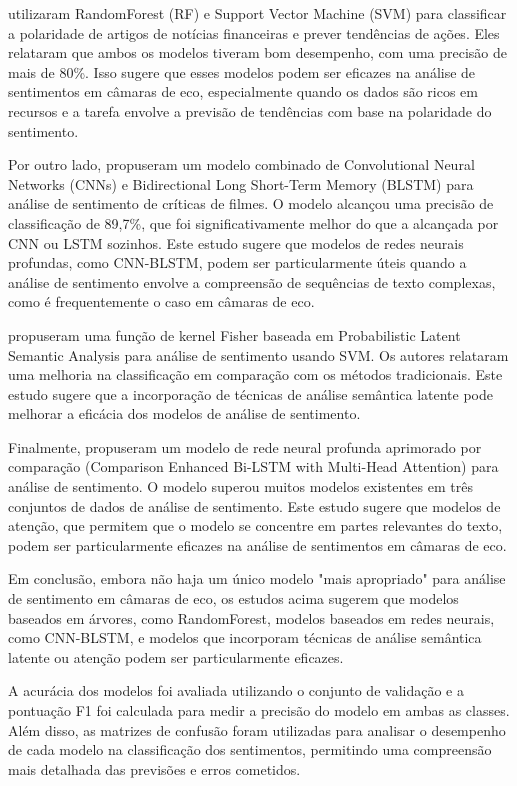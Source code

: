  utilizaram RandomForest (RF) e Support Vector Machine (SVM) para classificar a polaridade de artigos de notícias financeiras e prever tendências de ações. Eles relataram que ambos os modelos tiveram bom desempenho, com uma precisão de mais de 80\%. Isso sugere que esses modelos podem ser eficazes na análise de sentimentos em câmaras de eco, especialmente quando os dados são ricos em recursos e a tarefa envolve a previsão de tendências com base na polaridade do sentimento.

Por outro lado,  propuseram um modelo combinado de Convolutional Neural Networks (CNNs) e Bidirectional Long Short-Term Memory (BLSTM) para análise de sentimento de críticas de filmes. O modelo alcançou uma precisão de classificação de 89,7\%, que foi significativamente melhor do que a alcançada por CNN ou LSTM sozinhos. Este estudo sugere que modelos de redes neurais profundas, como CNN-BLSTM, podem ser particularmente úteis quando a análise de sentimento envolve a compreensão de sequências de texto complexas, como é frequentemente o caso em câmaras de eco.

 propuseram uma função de kernel Fisher baseada em Probabilistic Latent Semantic Analysis para análise de sentimento usando SVM. Os autores relataram uma melhoria na classificação em comparação com os métodos tradicionais. Este estudo sugere que a incorporação de técnicas de análise semântica latente pode melhorar a eficácia dos modelos de análise de sentimento.

Finalmente,  propuseram um modelo de rede neural profunda aprimorado por comparação (Comparison Enhanced Bi-LSTM with Multi-Head Attention) para análise de sentimento. O modelo superou muitos modelos existentes em três conjuntos de dados de análise de sentimento. Este estudo sugere que modelos de atenção, que permitem que o modelo se concentre em partes relevantes do texto, podem ser particularmente eficazes na análise de sentimentos em câmaras de eco.

Em conclusão, embora não haja um único modelo "mais apropriado" para análise de sentimento em câmaras de eco, os estudos acima sugerem que modelos baseados em árvores, como RandomForest, modelos baseados em redes neurais, como CNN-BLSTM, e modelos que incorporam técnicas de análise semântica latente ou atenção podem ser particularmente eficazes.

A acurácia dos modelos foi avaliada utilizando o conjunto de validação e a pontuação F1 foi calculada para medir a precisão do modelo em ambas as classes. Além disso, as matrizes de confusão foram utilizadas para analisar o desempenho de cada modelo na classificação dos sentimentos, permitindo uma compreensão mais detalhada das previsões e erros cometidos.

